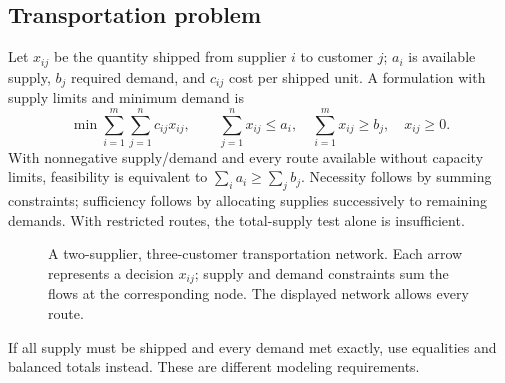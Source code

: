\documentclass[11pt,a4paper]{article}
\begin{document}
\subsection{Transportation problem}
Let $x_{ij}$ be the quantity shipped from supplier $i$ to customer $j$;
$a_i$ is available supply, $b_j$ required demand, and $c_{ij}$ cost per shipped
unit. A formulation with supply limits and minimum demand is
\[
  \min\sum_{i=1}^m\sum_{j=1}^n c_{ij}x_{ij},\qquad
  \sum_{j=1}^n x_{ij}\leq a_i,\quad
  \sum_{i=1}^m x_{ij}\geq b_j,\quad x_{ij}\geq0.
\]
With nonnegative supply/demand and every route
available without capacity limits, feasibility is equivalent to
$\sum_i a_i\geq\sum_j b_j$. Necessity follows by summing constraints;
sufficiency follows by allocating supplies successively to remaining demands.
With restricted routes, the total-supply test alone is insufficient.

\begin{figure}[H]
  \centering
  \caption{A two-supplier, three-customer transportation network. Each arrow
    represents a decision $x_{ij}$; supply and demand constraints sum the flows at
    the corresponding node. The displayed network allows every route.}\label{fig:transport}
\end{figure}

If all supply must be shipped and every demand met exactly, use equalities and
balanced totals instead. These are different modeling requirements.
\end{document}
